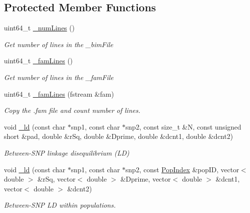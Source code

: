 \subsection*{Protected Member Functions}
\begin{DoxyCompactItemize}
\item 
uint64\+\_\+t \hyperlink{classsamp_files_1_1_bed_file_i_ae0a3bbe25250cb77336d1eb07643c03e}{\+\_\+num\+Lines} ()
\begin{DoxyCompactList}\small\item\em Get number of lines in the {\ttfamily \+\_\+bim\+File} \end{DoxyCompactList}\item 
uint64\+\_\+t \hyperlink{classsamp_files_1_1_bed_file_i_a40dbd1c78781d4eb32f59620624bfa8a}{\+\_\+fam\+Lines} ()
\begin{DoxyCompactList}\small\item\em Get number of lines in the {\ttfamily \+\_\+fam\+File} \end{DoxyCompactList}\item 
uint64\+\_\+t \hyperlink{classsamp_files_1_1_bed_file_i_ad0898ea2f902dbd7c01e66ae3133c0b9}{\+\_\+fam\+Lines} (fstream \&fam)
\begin{DoxyCompactList}\small\item\em Copy the .fam file and count number of lines. \end{DoxyCompactList}\item 
void \hyperlink{classsamp_files_1_1_bed_file_i_a9b6f8cbb9ae05056a7cd3d487fb26c30}{\+\_\+ld} (const char $\ast$snp1, const char $\ast$snp2, const size\+\_\+t \&N, const unsigned short \&pad, double \&r\+Sq, double \&Dprime, double \&dcnt1, double \&dcnt2)
\begin{DoxyCompactList}\small\item\em Between-\/\+S\+NP linkage disequilibrium (LD) \end{DoxyCompactList}\item 
void \hyperlink{classsamp_files_1_1_bed_file_i_ac0ebb71cdebd43d1b024cfc747fd53d1}{\+\_\+ld} (const char $\ast$snp1, const char $\ast$snp2, const \hyperlink{classsamp_files_1_1_pop_index}{Pop\+Index} \&pop\+ID, vector$<$ double $>$ \&r\+Sq, vector$<$ double $>$ \&Dprime, vector$<$ double $>$ \&dcnt1, vector$<$ double $>$ \&dcnt2)
\begin{DoxyCompactList}\small\item\em Between-\/\+S\+NP LD within populations. \end{DoxyCompactList}\end{DoxyCompactItemize}
